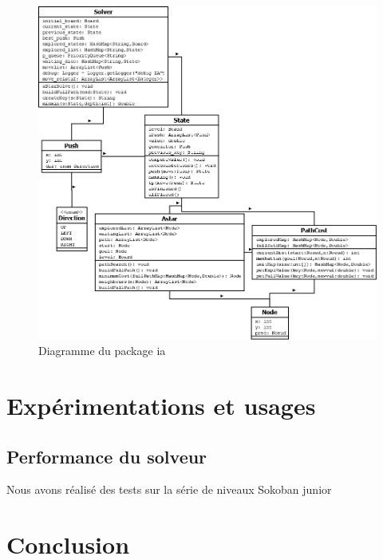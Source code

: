 \documentclass[a4paper,12pt]{article} %
\begin{document}
\begin{figure}[!h]
\centering
\includegraphics[scale=0.3]{images/diag_ia.png}
\caption{Diagramme du package ia}
\end{figure}

\section{Expérimentations et usages}

\subsection{Performance du solveur}


Nous avons réalisé des tests sur la série de niveaux Sokoban junior
\section*{Conclusion}
\end{document}

